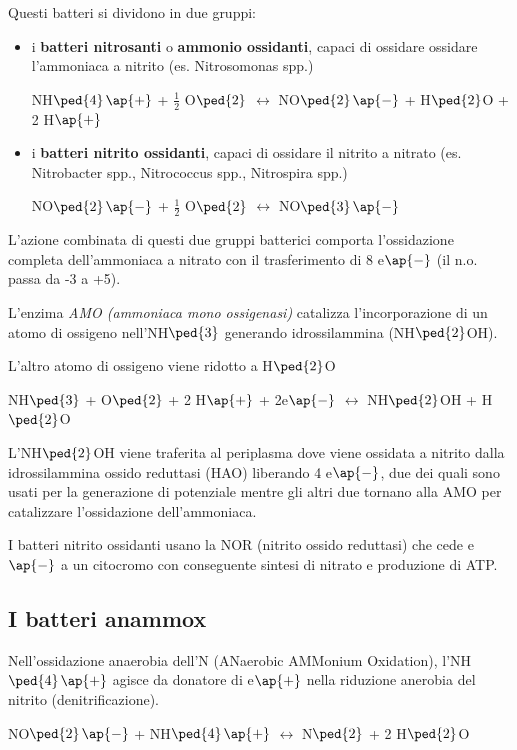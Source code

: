\documentclass[11pt]{book}
\begin{document}
Questi batteri si dividono in due gruppi:
\begin{itemize}
\item i \textbf{batteri nitrosanti} o \textbf{ammonio ossidanti}, capaci di ossidare ossidare l’ammoniaca a nitrito (es. Nitrosomonas spp.) 

NH$\ped{4}$$\ap{+}$ + $\frac{1}{2}$ O$\ped{2}$ $\longleftrightarrow$ NO$\ped{2}$$\ap{-}$ + H$\ped{2}$O + 2 H$\ap{+}$ 

\item i \textbf{batteri nitrito ossidanti}, capaci di ossidare il nitrito a nitrato (es. Nitrobacter spp., Nitrococcus spp., Nitrospira spp.)

NO$\ped{2}$$\ap{-}$ + $\frac{1}{2}$ O$\ped{2}$ $\longleftrightarrow$ NO$\ped{3}$$\ap{-}$ 

\end{itemize}


L’azione combinata di questi due gruppi batterici comporta l’ossidazione completa dell’ammoniaca a nitrato con il trasferimento di 8 e$\ap{-}$ (il n.o. passa da -3 a +5).

L'enzima \emph{AMO (ammoniaca mono ossigenasi)} catalizza l’incorporazione di un atomo di ossigeno nell’NH$\ped{3}$ generando idrossilammina (NH$\ped{2}$OH). 

L’altro atomo di ossigeno viene ridotto a H$\ped{2}$O 

NH$\ped{3}$ + O$\ped{2}$ + 2 H$\ap{+}$ + 2e$\ap{-}$ $\longleftrightarrow$ NH$\ped{2}$OH + H$\ped{2}$O

L’NH$\ped{2}$OH viene traferita al periplasma dove viene ossidata a nitrito dalla idrossilammina ossido reduttasi (HAO) liberando 4 e$\ap{-}$, due dei quali sono usati per la generazione di potenziale mentre gli altri due tornano alla AMO per catalizzare l’ossidazione dell’ammoniaca.

I batteri nitrito ossidanti usano la NOR (nitrito ossido reduttasi) che cede e$\ap{-}$ a un citocromo con conseguente sintesi di nitrato e produzione di ATP.

\subsection{I batteri anammox}
Nell'ossidazione anaerobia dell’N (ANaerobic AMMonium Oxidation), l’NH$\ped{4}$$\ap{+}$ agisce da donatore di e$\ap{+}$ nella riduzione anerobia del nitrito (denitrificazione).

NO$\ped{2}$$\ap{-}$ + NH$\ped{4}$$\ap{+}$ $\longleftrightarrow$ N$\ped{2}$ + 2 H$\ped{2}$O 
\end{document}
